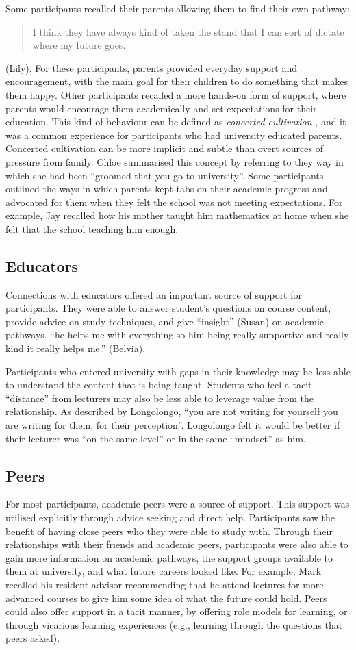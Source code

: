 Some participants recalled their parents allowing them to find their own pathway: \blockquote{I think they have always kind of taken the stand that I can sort of dictate where my future goes.} (Lily). For these participants, parents provided everyday support and encouragement, with the main goal for their children to do something that makes them happy. Other participants recalled a more hands-on form of support, where parents would encourage them academically and set expectations for their education. This kind of behaviour can be defined as \textit{concerted cultivation} \citep{lareau2011unequal}, and it was a common experience for participants who had university educated parents. Concerted cultivation can be more implicit and subtle than overt sources of pressure from family. Chloe summarised this concept by referring to they way in which she had been ``groomed that you go to university''. Some participants outlined the ways in which parents kept tabs on their academic progress and advocated for them when they felt the school was not meeting expectations. For example, Jay recalled how his mother taught him mathematics at home when she felt that the school teaching him enough.

\subsection{Educators}
Connections with educators offered an important source of support for participants. They were able to answer student's questions on course content, provide advice on study techniques, and give ``insight'' (Susan) on academic pathways. ``he helps me with everything so him being really supportive and really kind it really helps me.'' (Belvia).

Participants who entered university with gaps in their knowledge may be less able to understand the content that is being taught. Students who feel a tacit ``distance'' from lecturers may also be less able to leverage value from the relationship. As described by Longolongo, ``you are not writing for yourself you are writing for them, for their perception''. Longolongo felt it would be better if their lecturer was ``on the same level'' or in the same ``mindset'' as him. 



\subsection{Peers}
For most participants, academic peers were a source of support. This support was utilised explicitly through advice seeking and direct help. Participants saw the benefit of having close peers who they were able to study with. Through their relationships with their friends and academic peers, participants were also able to gain more information on academic pathways, the support groups available to them at university, and what future careers looked like. For example, Mark recalled his resident advisor recommending that he attend lectures for more advanced courses to give him some idea of what the future could hold. Peers could also offer support in a tacit manner, by offering role models for learning, or through vicarious learning experiences (e.g., learning through the questions that peers asked). 

